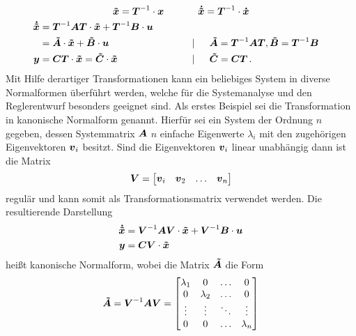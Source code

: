 \begin{equation}
\boldsymbol{\tilde{x}} = \boldsymbol{T}^{-1}\cdot\boldsymbol{x} \hspace{35pt}\boldsymbol{\dot{\tilde{x}}} = \boldsymbol{T}^{-1}\cdot \boldsymbol{\dot{x}}
\end{equation}
\begin{align}
\boldsymbol{\dot{\tilde{x}}} &= \boldsymbol{T}^{-1}\boldsymbol{A}\boldsymbol{T}\cdot \boldsymbol{\tilde{x}} + \boldsymbol{T}^{-1}\boldsymbol{B}\cdot \boldsymbol{u} \nonumber \\
& = \boldsymbol{\tilde{A}}\cdot \boldsymbol{\tilde{x}} + \boldsymbol{\tilde{B}}\cdot \boldsymbol{u} &&\hspace{30pt} \vert \hspace{15pt} \boldsymbol{\tilde{A}} = \boldsymbol{T}^{-1}\boldsymbol{A}\boldsymbol{T}, \boldsymbol{\tilde{B}} = \boldsymbol{T}^{-1}\boldsymbol{B}
\\
\boldsymbol{y} &= \boldsymbol{C}\boldsymbol{T}\cdot \boldsymbol{\tilde{x}} 
= \boldsymbol{\tilde{C}}\cdot \boldsymbol{\tilde{x}} &&\hspace{30pt} \vert \hspace{15pt} \boldsymbol{\tilde{C}} = \boldsymbol{C}\boldsymbol{T}\,.
\end{align}
Mit Hilfe derartiger Transformationen kann ein beliebiges System in diverse Normalformen überführt werden, welche für die Systemanalyse und den Reglerentwurf besonders geeignet sind. Als erstes Beispiel sei die Transformation in kanonische Normalform genannt. Hierfür sei ein System  der Ordnung $n$ gegeben, dessen Systemmatrix $\boldsymbol{A}$ $n$ einfache Eigenwerte $\lambda_i$ mit den zugehörigen Eigenvektoren $\boldsymbol{v}_i$ besitzt. Sind die Eigenvektoren $\boldsymbol{v}_i$ linear unabhängig dann ist die Matrix
\begin{equation}
\boldsymbol{V} = \begin{bmatrix}
\boldsymbol{v}_i & \boldsymbol{v}_2 & \hdots & \boldsymbol{v}_n 
\end{bmatrix}
\end{equation}
regulär und kann somit als Transformationsmatrix verwendet werden. Die resultierende Darstellung
\begin{equation}
\begin{split}
\boldsymbol{\dot{\tilde{x}}} &= \boldsymbol{V}^{-1}\boldsymbol{A}\boldsymbol{V}\cdot \boldsymbol{\tilde{x}} + \boldsymbol{V}^{-1}\boldsymbol{B}\cdot \boldsymbol{u} \\
\boldsymbol{y} &= \boldsymbol{C}\boldsymbol{V}\cdot \boldsymbol{\tilde{x}}
\end{split}
\end{equation}
heißt kanonische Normalform, wobei die Matrix $\boldsymbol{\tilde{A}}$ die Form
\begin{equation}
\boldsymbol{\tilde{A}} = \boldsymbol{V}^{-1}\boldsymbol{A}\boldsymbol{V} = \begin{bmatrix}
\lambda_1 & 0 & \hdots & 0 \\
0 & \lambda_2 & \hdots & 0 \\
\vdots & \vdots & \ddots & \vdots \\
0 & 0 & \hdots & \lambda_n
\end{bmatrix}
\end{equation}
